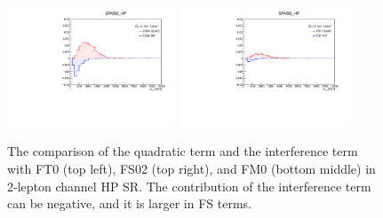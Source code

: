 \begin{figure}[]
    \centering
    	\includegraphics[width=0.45\textwidth]{figures/aQGC/FS02_0ptag1pfat0pjet_0ptv_SRVBS_HP_MllJ.pdf}
    	\includegraphics[width=0.45\textwidth]{figures/aQGC/FS1_0ptag1pfat0pjet_0ptv_SRVBS_HP_MllJ.pdf}
        \caption{The comparison of the quadratic term and the interference term with FT0 (top left), FS02 (top right), and FM0 (bottom middle) in 2-lepton channel HP SR. The contribution of the interference term can be negative, and it is larger in FS terms. }
        \label{fig:quadintFS}
\end{figure}
